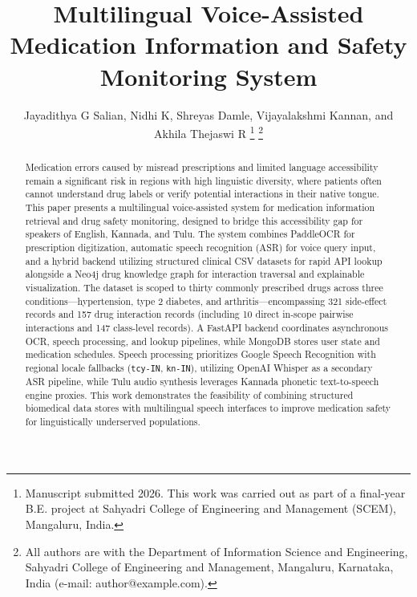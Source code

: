 \documentclass[9pt,journal,twoside,web]{ieeecolor}
\begin{document}
\title{Multilingual Voice-Assisted Medication Information and Safety Monitoring System}

\author{Jayadithya G Salian, Nidhi K, Shreyas Damle, Vijayalakshmi Kannan, and Akhila Thejaswi R
\thanks{Manuscript submitted 2026. This work was carried out as part of a final-year B.E. project at Sahyadri College of Engineering and Management (SCEM), Mangaluru, India.}
\thanks{All authors are with the Department of Information Science and Engineering, Sahyadri College of Engineering and Management, Mangaluru, Karnataka, India (e-mail: author@example.com).}}

\maketitle

\begin{abstract}
Medication errors caused by misread prescriptions and limited language accessibility remain a significant risk in regions with high linguistic diversity, where patients often cannot understand drug labels or verify potential interactions in their native tongue. This paper presents a multilingual voice-assisted system for medication information retrieval and drug safety monitoring, designed to bridge this accessibility gap for speakers of English, Kannada, and Tulu. The system combines PaddleOCR for prescription digitization, automatic speech recognition (ASR) for voice query input, and a hybrid backend utilizing structured clinical CSV datasets for rapid API lookup alongside a Neo4j drug knowledge graph for interaction traversal and explainable visualization. The dataset is scoped to thirty commonly prescribed drugs across three conditions---hypertension, type 2 diabetes, and arthritis---encompassing 321 side-effect records and 157 drug interaction records (including 10 direct in-scope pairwise interactions and 147 class-level records). A FastAPI backend coordinates asynchronous OCR, speech processing, and lookup pipelines, while MongoDB stores user state and medication schedules. Speech processing prioritizes Google Speech Recognition with regional locale fallbacks (\texttt{tcy-IN}, \texttt{kn-IN}), utilizing OpenAI Whisper as a secondary ASR pipeline, while Tulu audio synthesis leverages Kannada phonetic text-to-speech engine proxies. This work demonstrates the feasibility of combining structured biomedical data stores with multilingual speech interfaces to improve medication safety for linguistically underserved populations.
\end{abstract}
\end{document}
